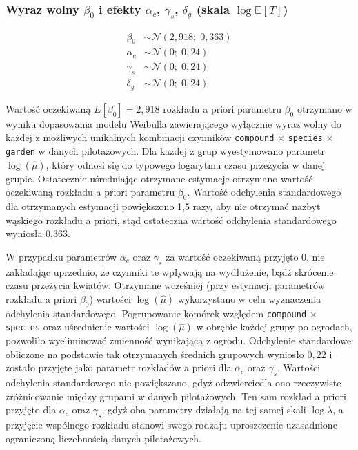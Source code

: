 \documentclass[12pt, a4paper]{article}
\begin{document}
\subsubsection{Wyraz wolny $\beta_0$ i efekty $\alpha_c$, $\gamma_s$, $\delta_g$ (skala $\log \mathbb{E}[T]$)}

\begin{align}
    \beta_0  &\sim \mathcal{N}(2{,}918;\; 0{,}363) \\
    \alpha_c &\sim \mathcal{N}(0;\; 0{,}24) \\
    \gamma_s &\sim \mathcal{N}(0;\; 0{,}24) \\
    \delta_g &\sim \mathcal{N}(0;\; 0{,}24)
\end{align}

\par Wartość oczekiwaną $E[\beta_0] = 2{,}918$ rozkładu a priori parametru $\beta_0$ otrzymano w wyniku dopasowania modelu Weibulla zawierającego wyłącznie wyraz wolny do każdej z możliwych unikalnych kombinacji czynników \texttt{compound} $\times$ \texttt{species} $\times$ \texttt{garden} w danych pilotażowych. Dla każdej z grup wyestymowano parametr $\log(\hat{\mu})$, który odnosi się do typowego logarytmu czasu przeżycia w danej grupie. Ostatecznie uśredniając otrzymane estymacje otrzymano wartość oczekiwaną rozkładu a priori parametru $\beta_0$. Wartość odchylenia standardowego dla otrzymanych estymacji powiększono 1,5 razy, aby nie otrzymać nazbyt wąskiego rozkładu a priori, stąd ostateczna wartość odchylenia standardowego wyniosła 0{,}363.

\par W przypadku parametrów $\alpha_c$ oraz $\gamma_s$ za wartość oczekiwaną przyjęto 0, nie zakładając uprzednio, że czynniki te wpływają na wydłużenie, bądź skrócenie czasu przeżycia kwiatów. Otrzymane wcześniej (przy estymacji parametrów rozkładu a priori $\beta_0$) wartości $\log(\hat{\mu})$ wykorzystano w celu wyznaczenia odchylenia standardowego. Pogrupowanie komórek względem \texttt{compound} $\times$ \texttt{species} oraz uśrednienie wartości $\log(\hat{\mu})$ w obrębie każdej grupy po ogrodach, pozwoliło wyeliminować zmienność wynikającą z ogrodu. Odchylenie standardowe obliczone na podstawie tak otrzymanych średnich grupowych wyniosło $0{,}22$ i zostało przyjęte jako parametr rozkładów a priori dla $\alpha_c$ oraz $\gamma_s$. Wartości odchylenia standardowego nie powiększano, gdyż odzwierciedla ono rzeczywiste zróżnicowanie między grupami w danych pilotażowych. Ten sam rozkład a priori przyjęto dla $\alpha_c$ oraz $\gamma_s$, gdyż oba parametry działają na tej samej skali $\log\lambda$, a przyjęcie wspólnego rozkładu stanowi swego rodzaju uproszczenie uzasadnione ograniczoną liczebnością danych pilotażowych.
\end{document}
